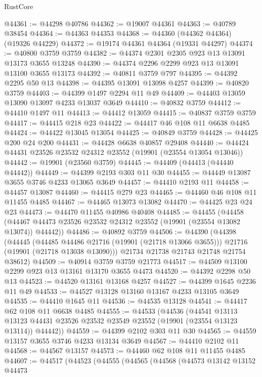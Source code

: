 \begin{lexlean}{RustCore}
\begin{coremodule}
@44361 := @44298 @40786
@44362 := @19007 @44361
@44363 := @40789 @38454
@44364 := @44363 @44353
@44368 := @44360 (@44362 @44364) (@19326 @44229)
@44372 := @19174 @44361 @44364 (@19331 @44297)
@44374 := @40800 @3759 @3759
@44382 := @44374 @2301 @2305 @923 @13 @13091 @13173 @3655 @13248
@44390 := @44374 @2296 @2299 @923 @13 @13091 @13100 @3655 @13173
@44392 := @40811 @3759 @797
@44395 := @44392 @2295 @50 @13
@44398 := @44395 @13091 @13098 @4257
@44399 := @40820 @3759
@44403 := @44399 @1497 @2294 @11 @49
@44409 := @44403 @13059 @13090 @13097 @4233 @13037 @3649
@44410 := @40832 @3759
@44412 := @44410 @1497 @11
@44413 := @44412 @13059
@44415 := @40837 @3759 @3759
@44417 := @44415 @218 @23
@44422 := @44417 @46 @108 @11 @6638 @4485
@44424 := @44422 @13045 @13054
@44425 := @40849 @3759
@44428 := @44425 @200 @24 @200
@44431 := @44428 @6638 @40857 @29408
@44440 := @44424 @44431 @23526 @23532 @24312 @23552 (@19901 (@23554 @13054 @13046))
@44442 := @19901 (@23560 @3759)
@44445 := @44409 (@44413 (@44440 @44442))
@44449 := @44399 @2193 @303 @11 @30
@44455 := @44449 @13087 @3655 @3746 @4233 @13065 @3649
@44457 := @44410 @2193 @11
@44458 := @44457 @13087
@44460 := @44415 @279 @23
@44465 := @44460 @46 @108 @11 @11455 @4485
@44467 := @44465 @13073 @13082
@44470 := @44425 @23 @24 @23
@44473 := @44470 @11455 @40986 @40408
@44485 := @44455
    (@44458 (@44467 @44473 @23526 @23532 @24312 @23552 (@19901 (@23554 @13082 @13074)) @44442))
@44486 := @40892 @3759
@44506 := @44390
    (@44398
      (@44445
        (@44485 @44486 @21716 (@19901 (@21718 @13066 @3655)))
        @21716
        (@19901 (@21718 @13038 @13090)))
      @21734
      @21738
      @21743
      @21748
      @21754
      @38612)
@44509 := @40914 @3759 @3759 @21773
@44517 := @44509 @13100 @2299 @923 @13 @13161 @13170 @3655 @4473
@44520 := @44392 @2298 @50 @13
@44523 := @44520 @13161 @13168 @4257
@44527 := @44399 @1645 @2236 @11 @49
@44533 := @44527 @13128 @13160 @13167 @4233 @13105 @3649
@44535 := @44410 @1645 @11
@44536 := @44535 @13128
@44541 := @44417 @62 @108 @11 @6638 @4485
@44555 := @44533
    (@44536
      (@44541
        @13113
        @13123
        @44431
        @23526
        @23532
        @23549
        @23552
        (@19901 (@23554 @13123 @13114))
        @44442))
@44559 := @44399 @2102 @303 @11 @30
@44565 := @44559 @13157 @3655 @3746 @4233 @13134 @3649
@44567 := @44410 @2102 @11
@44568 := @44567 @13157
@44573 := @44460 @62 @108 @11 @11455 @4485
@44607 := @44517
    (@44523
      (@44555
        (@44565
          (@44568
            (@44573
              @13142
              @13152
              @44473

\end{coremodule}
\end{lexlean}
